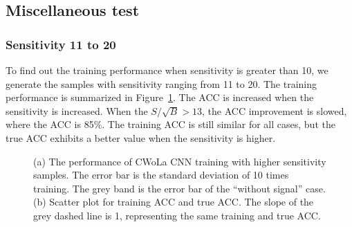 \documentclass[12pt]{article}
\begin{document}
    \subsection{Miscellaneous test}%
    \label{sub:miscellaneous_test}
        \subsubsection{Sensitivity 11 to 20}%
        \label{subs:sensitivity_11_to_20}
            To find out the training performance when sensitivity is greater than 10, we generate the samples with sensitivity ranging from 11 to 20. The training performance is summarized in Figure~\ref{fig:cwola_cnn_training_performance_11_20}. The ACC is increased when the sensitivity is increased. When the $S / \sqrt{B} > 13$, the ACC improvement is slowed, where the ACC is 85\%. The training ACC is still similar for all cases, but the true ACC exhibits a better value when the sensitivity is higher.
            \begin{figure}[htpb]
                \centering
                \caption{(a) The performance of CWoLa CNN training with higher sensitivity samples. The error bar is the standard deviation of 10 times training. The grey band is the error bar of the ``without signal'' case. (b) Scatter plot for training ACC and true ACC. The slope of the grey dashed line is 1, representing the same training and true ACC.}
                \label{fig:cwola_cnn_training_performance_11_20}
            \end{figure}
\end{document}
